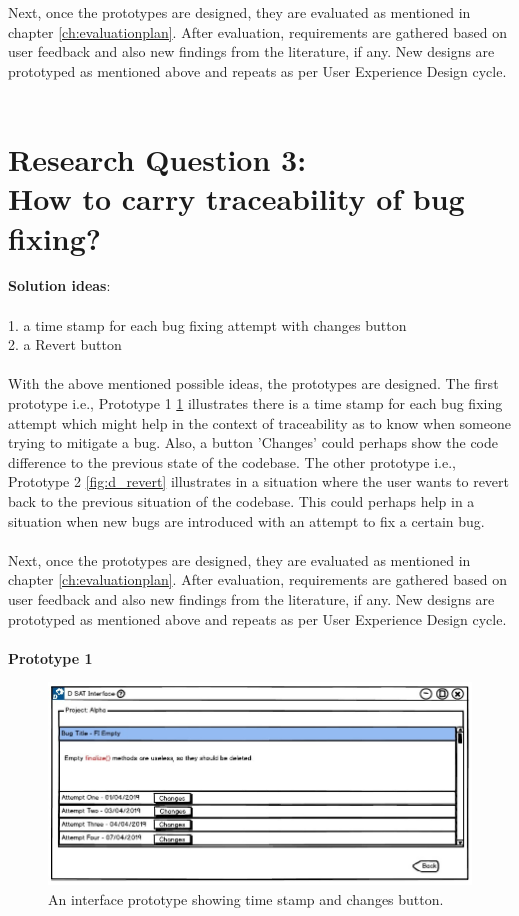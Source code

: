 Next, once the prototypes are designed, they are evaluated as mentioned in chapter \ref{ch:evaluationplan}. After evaluation, requirements are gathered based on user feedback and also new findings from the literature, if any. New designs are prototyped as mentioned above and repeats as per User Experience Design cycle. \\ \\

\section{Research Question 3:  \\ How to carry traceability of bug fixing?} 

\textbf{Solution ideas}: \\ \\
1. a time stamp for each bug fixing attempt with changes button \\
2. a Revert button \\ \\

With the above mentioned possible ideas, the prototypes are designed. The first prototype i.e., Prototype 1 \ref{fig:d_changes} illustrates there is a time stamp for each bug fixing attempt which might help in the context of traceability as to know when someone trying to mitigate a bug. Also, a button 'Changes' could perhaps show the code difference to the previous state of the codebase. The other prototype i.e., Prototype 2 \ref{fig:d_revert} illustrates in a situation where the user wants to revert back to the previous situation of the codebase. This could perhaps help in a situation when new bugs are introduced with an attempt to fix a certain bug. \\ \\

Next, once the prototypes are designed, they are evaluated as mentioned in chapter \ref{ch:evaluationplan}. After evaluation, requirements are gathered based on user feedback and also new findings from the literature, if any. New designs are prototyped as mentioned above and repeats as per User Experience Design cycle. \\ \\

\textbf{Prototype 1}
\begin{figure}[hbt!]
	\centering
	\includegraphics[width=\linewidth]{figures/d_changes}
	\caption{An interface prototype showing time stamp and changes button.}
	\label{fig:d_changes}
\end{figure}

